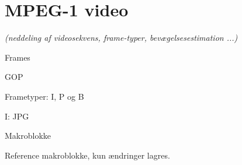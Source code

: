 \newpage
\section{MPEG-1 video}
\textit{(neddeling af videosekvens, frame-typer, bevægelsesestimation ...)}

Frames

GOP

Frametyper: I, P og B

I: JPG

Makroblokke

Reference makroblokke, kun ændringer lagres.
